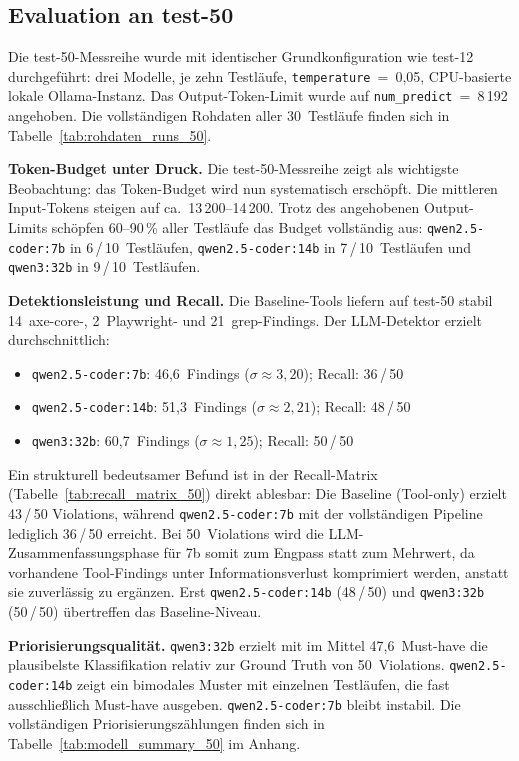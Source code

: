 \subsection{Evaluation an test-50}
\label{sec:eval_suiten}

Die test-50-Messreihe wurde mit identischer Grundkonfiguration wie test-12 durchgeführt: drei Modelle, je zehn Testläufe, \texttt{temperature}~=~0{,}05, \ac{CPU}-basierte lokale Ollama-Instanz. Das Output-Token-Limit wurde auf \texttt{num\_predict}~=~8\,192 angehoben. Die vollständigen Rohdaten aller 30~Testläufe finden sich in Tabelle~\ref{tab:rohdaten_runs_50}.

\textbf{Token-Budget unter Druck.}
Die test-50-Messreihe zeigt als wichtigste Beobachtung: das Token-Budget wird nun systematisch erschöpft. Die mittleren Input-Tokens steigen auf ca.~13\,200--14\,200. Trotz des angehobenen Output-Limits schöpfen 60--90\,\% aller Testläufe das Budget vollständig aus: \texttt{qwen2.5-coder:7b} in 6\,/\,10~Testläufen, \texttt{qwen2.5-coder:14b} in 7\,/\,10~Testläufen und \texttt{qwen3:32b} in 9\,/\,10~Testläufen.

\textbf{Detektionsleistung und Recall.}
Die Baseline-Tools liefern auf test-50 stabil 14~axe-core-, 2~Playwright- und 21~grep-Findings. Der \ac{LLM}-Detektor erzielt durchschnittlich:
\begin{itemize}
  \item \texttt{qwen2.5-coder:7b}: 46{,}6~Findings ($\sigma \approx 3{,}20$); Recall: 36\,/\,50
  \item \texttt{qwen2.5-coder:14b}: 51{,}3~Findings ($\sigma \approx 2{,}21$); Recall: 48\,/\,50
  \item \texttt{qwen3:32b}: 60{,}7~Findings ($\sigma \approx 1{,}25$); Recall: 50\,/\,50
\end{itemize}
Ein strukturell bedeutsamer Befund ist in der Recall-Matrix (Tabelle~\ref{tab:recall_matrix_50}) direkt ablesbar: Die Baseline (Tool-only) erzielt 43\,/\,50 Violations, während \texttt{qwen2.5-coder:7b} mit der vollständigen Pipeline lediglich 36\,/\,50 erreicht. Bei 50~Violations wird die \ac{LLM}-Zusammenfassungsphase für 7b somit zum Engpass statt zum Mehrwert, da vorhandene Tool-Findings unter Informationsverlust komprimiert werden, anstatt sie zuverlässig zu ergänzen. Erst \texttt{qwen2.5-coder:14b} (48\,/\,50) und \texttt{qwen3:32b} (50\,/\,50) übertreffen das Baseline-Niveau.

\textbf{Priorisierungsqualität.}
\texttt{qwen3:32b} erzielt mit im Mittel 47{,}6~Must-have die plausibelste Klassifikation relativ zur Ground Truth von 50~Violations. \texttt{qwen2.5-coder:14b} zeigt ein bimodales Muster mit einzelnen Testläufen, die fast ausschließlich Must-have ausgeben. \texttt{qwen2.5-coder:7b} bleibt instabil. Die vollständigen Priorisierungszählungen finden sich in Tabelle~\ref{tab:modell_summary_50} im Anhang.

